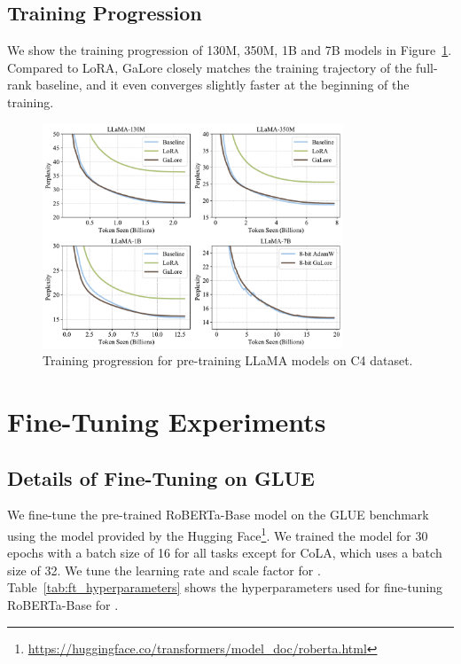 \newpage
\subsection{Training Progression}
We show the training progression of 130M, 350M, 1B and 7B models in Figure~\ref{fig:loss_curves}.
Compared to LoRA, GaLore closely matches the training trajectory of the full-rank baseline, and it even converges slightly faster at the beginning of the training. 

\begin{figure}[h]
    \centering
    \includegraphics[width=0.8\textwidth]{figures/files/loss_curves.pdf}
    \caption{Training progression for pre-training LLaMA models on C4 dataset.}
    \label{fig:loss_curves}
\end{figure}

\newpage
\section{Fine-Tuning Experiments}

\subsection{Details of Fine-Tuning on GLUE}

We fine-tune the pre-trained RoBERTa-Base model on the GLUE benchmark using the model provided by the Hugging Face\footnote{\url{https://huggingface.co/transformers/model_doc/roberta.html}}.
We trained the model for 30 epochs with a batch size of 16 for all tasks except for CoLA, which uses a batch size of 32.
We tune the learning rate and scale factor for \lowrank{}.
Table~\ref{tab:ft_hyperparameters} shows the hyperparameters used for fine-tuning RoBERTa-Base for \lowrank{}.


